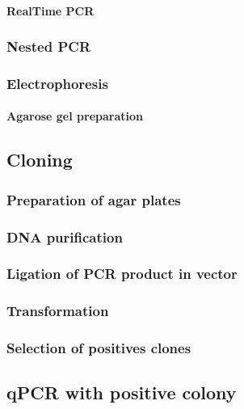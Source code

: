 \documentclass[a4paper]{article}
\begin{document}
\paragraph{RealTime PCR}

\subsubsection{Nested PCR}

\subsubsection{Electrophoresis}
\paragraph{Agarose gel preparation}

\subsection{Cloning}
\subsubsection{Preparation of agar plates}
\subsubsection{DNA purification}
\subsubsection{Ligation of PCR product in vector}
\subsubsection{Transformation}
\subsubsection{Selection of positives clones}

\subsection{qPCR with positive colony}

\pagebreak
\end{document}
